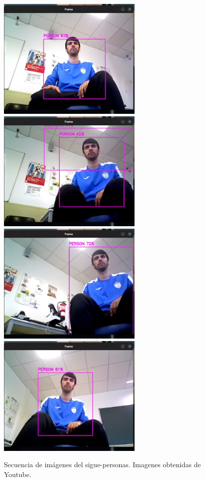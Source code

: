 \begin{figure} [H]
    \begin{center}
        \includegraphics[width=7cm]{figs/c5/sec_rot1.png}
        \includegraphics[width=7cm]{figs/c5/sec_rot2.png}
        \includegraphics[width=7cm]{figs/c5/sec_rot3.png}
        \includegraphics[width=7cm]{figs/c5/sec_rot4.png}
    \end{center}
    \caption[Secuencia sigue-personas rotación]{Secuencia de imágenes del sigue-personas. Imagenes obtenidas de Youtube\footnotemark.}
    \label{fig:sec_FP_rot}
\end{figure}



